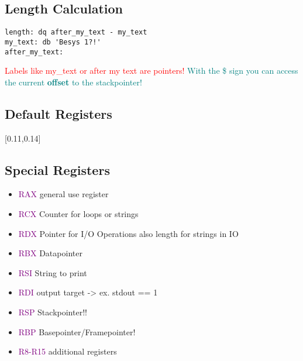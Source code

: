 \documentclass[main.tex,fontsize=7pt,paper=a4,paper=landscape,DIV=calc,]{scrartcl}
\begin{document}
\begin{multicols*}{4}
\subsection{Length Calculation}
\vspace{-2.5mm}
\begin{lstlisting}
length: dq after_my_text - my_text
my_text: db 'Besys 1?!'
after_my_text:
\end{lstlisting}
\vspace{2mm}
\textcolor{red}{Labels like my\_text or after my text are pointers!}\newline
\textcolor{teal}{With the \$ sign you can access the current \textbf{offset} to the stackpointer!}

\subsection{Default Registers}
[0.11,0.14]

\subsection{Special Registers}
\begin{itemize}
  \item \textcolor{purple}{RAX} general use register
  \item \textcolor{purple}{RCX} Counter for loops or strings
  \item \textcolor{purple}{RDX} Pointer for I/O Operations\newline
    also length for strings in IO
  \item \textcolor{purple}{RBX} Datapointer
  \item \textcolor{purple}{RSI} String to print
  \item \textcolor{purple}{RDI} output target -> ex. stdout == 1
  \item \textcolor{purple}{RSP} Stackpointer!!
  \item \textcolor{purple}{RBP} Basepointer/Framepointer!
  \item \textcolor{purple}{R8-R15} additional registers
\end{itemize}


\end{multicols*}
\end{document}
